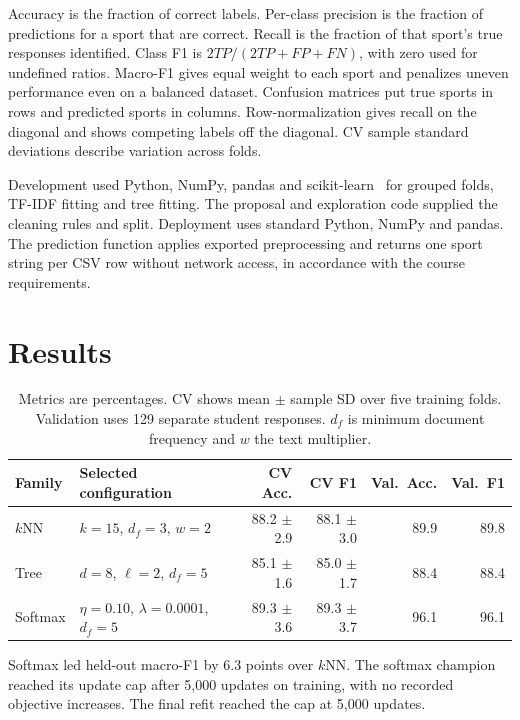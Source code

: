 \documentclass[12pt]{article}
\newcommand{\knn}{$k$NN}
\begin{document}
Accuracy is the fraction of correct labels. Per-class precision is the fraction
of predictions for a sport that are correct. Recall is the fraction of that
sport's true responses identified. Class F1 is $2TP/(2TP+FP+FN)$, with zero
used for undefined ratios. Macro-F1 gives equal weight to each sport and
penalizes uneven performance even on a balanced dataset. Confusion matrices put
true sports in rows and predicted sports in columns. Row-normalization gives
recall on the diagonal and shows competing labels off the diagonal. CV sample
standard deviations describe variation across folds.

Development used Python, NumPy, pandas and scikit-learn~\cite{pedregosa2011}
for grouped folds, TF-IDF fitting and tree fitting. The proposal and
exploration code supplied the cleaning rules and split. Deployment uses
standard Python, NumPy and pandas. The prediction function applies exported
preprocessing and returns one sport string per CSV row without network access,
in accordance with the course requirements.

\section{Results}\label{sec:results}

\begin{table}[h]
\centering
\small
\begin{tabular}{llrrrr}
\toprule
Family & Selected configuration & CV Acc. & CV F1 & Val.\ Acc. & Val.\ F1 \\
\midrule
\knn    & $k=15$, $d_f=3$, $w=2$ & 88.2 $\pm$ 2.9 & 88.1 $\pm$ 3.0 & 89.9 & 89.8 \\
Tree    & $d=8$, $\ell=2$, $d_f=5$ & 85.1 $\pm$ 1.6 & 85.0 $\pm$ 1.7 & 88.4 & 88.4 \\
Softmax & $\eta=0.10$, $\lambda=0.0001$, $d_f=5$ & 89.3 $\pm$ 3.6 & 89.3 $\pm$ 3.7 & 96.1 & 96.1 \\
\bottomrule
\end{tabular}
\caption{Metrics are percentages. CV shows mean $\pm$ sample SD over five
training folds. Validation uses 129 separate student responses. $d_f$ is
minimum document frequency and $w$ the text multiplier.}
\label{tab:family}
\end{table}

Softmax led held-out macro-F1 by 6.3 points over \knn. The softmax champion
reached its update cap after 5,000 updates on training, with no recorded
objective increases. The final refit reached the cap at 5,000 updates.
\end{document}
